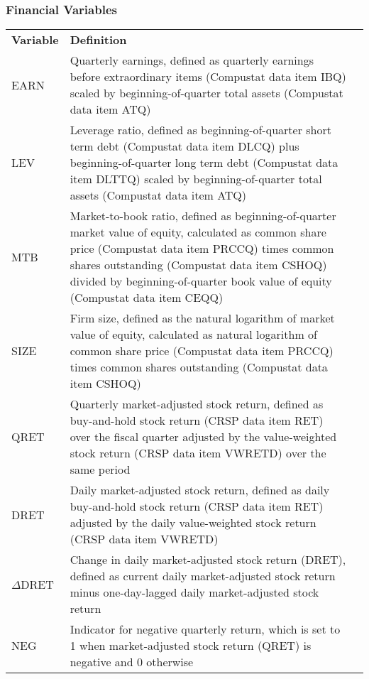 \subsubsection*{Financial Variables}
\begin{table}[H]
	\centering
	\begin{tabular}{lp{15cm}p{15cm}}
		\midrule
		\midrule
		\textbf{Variable} & \textbf{Definition} \\
		EARN & Quarterly earnings, defined as quarterly earnings before extraordinary items (Compustat data item IBQ) scaled by beginning-of-quarter total assets (Compustat data item ATQ) \\
		LEV & Leverage ratio, defined as beginning-of-quarter short term debt (Compustat data item DLCQ) plus beginning-of-quarter long term debt (Compustat data item DLTTQ) scaled by beginning-of-quarter total assets (Compustat data item ATQ) \\
		MTB & Market-to-book ratio, defined as beginning-of-quarter market value of equity, calculated as common share price (Compustat data item PRCCQ) times common shares outstanding (Compustat data item CSHOQ) divided by beginning-of-quarter book value of equity (Compustat data item CEQQ) \\
		SIZE & Firm size, defined as the natural logarithm of market value of equity, calculated as natural logarithm of common share price (Compustat data item PRCCQ) times common shares outstanding (Compustat data item CSHOQ) \\
		QRET & Quarterly market-adjusted stock return, defined as buy-and-hold stock return (CRSP data item RET) over the fiscal quarter adjusted by the value-weighted stock return (CRSP data item VWRETD) over the same period \\
		DRET & Daily market-adjusted stock return, defined as daily buy-and-hold stock return (CRSP data item RET) adjusted by the daily value-weighted stock return (CRSP data item VWRETD)\\
		$\Delta$DRET & Change in daily market-adjusted stock return (DRET), defined as current daily market-adjusted stock return minus one-day-lagged daily market-adjusted stock return \\
		NEG & Indicator for negative quarterly return, which is set to 1 when market-adjusted stock return (QRET) is negative and 0 otherwise \\

\end{tabular}
\end{table}
